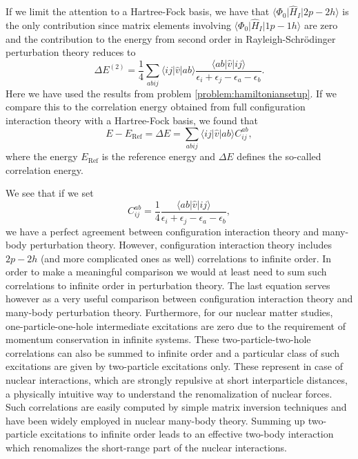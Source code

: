   If we limit the attention to a Hartree-Fock basis, we have that
  $\langle\Phi_0\vert \hat{H}_I \vert 2p-2h\rangle$ is the only
  contribution since matrix elements involving $\langle\Phi_0\vert
  \hat{H}_I \vert 1p-1h\rangle$ are zero and the contribution to the
  energy from second order in Rayleigh-Schr\"odinger perturbation
  theory reduces to
  \[
  \Delta E^{(2)}=\frac{1}{4}\sum_{abij}\langle ij\vert \hat{v}\vert
  ab\rangle \frac{\langle ab\vert \hat{v}\vert
    ij\rangle}{\epsilon_i+\epsilon_j-\epsilon_a-\epsilon_b}.
  \]
Here we have used the results from problem \ref{problem:hamiltoniansetup}. 
  If we compare this to the correlation energy obtained from full
  configuration interaction theory with a Hartree-Fock basis, we found
  that
  \[
  E-E_{\mathrm{Ref}} =\Delta E=\sum_{abij}\langle ij | \hat{v}| ab
  \rangle C_{ij}^{ab},
  \]
  where the energy $E_{\mathrm{Ref}}$ is the reference energy and
  $\Delta E$ defines the so-called correlation energy.

  We see that if we set
  \[
  C_{ij}^{ab} =\frac{1}{4}\frac{\langle ab \vert \hat{v} \vert ij
    \rangle}{\epsilon_i+\epsilon_j-\epsilon_a-\epsilon_b},
  \]
  we have a perfect agreement between configuration interaction  theory  and many-body perturbation
  theory. However, configuration interaction  theory includes $2p-2h$ (and more complicated ones as
  well) correlations to infinite order. In order to make a meaningful
  comparison we would at least need to sum such correlations to
  infinite order in perturbation theory. The last equation serves
  however as a very useful comparison between configuration interaction  theory and many-body
  perturbation theory. Furthermore, for our nuclear matter studies,
  one-particle-one-hole intermediate excitations are zero due to the
  requirement of momentum conservation in infinite systems. These
  two-particle-two-hole correlations can also be summed to infinite
  order and a particular class of such excitations are given by
  two-particle excitations only. These represent in case of nuclear interactions, which
  are strongly repulsive at short interparticle distances, a
  physically intuitive way to understand the renomalization of nuclear
  forces. Such correlations are easily computed by simple matrix
  inversion techniques and have been widely employed in nuclear
  many-body theory.  Summing up two-particle excitations to infinite
  order leads to an effective two-body interaction which renomalizes
  the short-range part of the nuclear interactions. 


